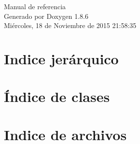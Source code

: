 \documentclass[twoside]{book}
\newcommand{\clearemptydoublepage}{%
  \newpage{\pagestyle{empty}\cleardoublepage}%
}
\begin{document}
\hypersetup{pageanchor=false}
\begin{titlepage}
\vspace*{7cm}
\begin{center}%
{\Large Manual de referencia}\\
\vspace*{1cm}
{\large Generado por Doxygen 1.8.6}\\
\vspace*{0.5cm}
{\small Miércoles, 18 de Noviembre de 2015 21:58:35}\\
\end{center}
\end{titlepage}
\clearemptydoublepage
\tableofcontents
\clearemptydoublepage
{}
\hypersetup{pageanchor=true}

\chapter{Indice jerárquico}

\chapter{Índice de clases}

\chapter{Indice de archivos}

\end{document}

